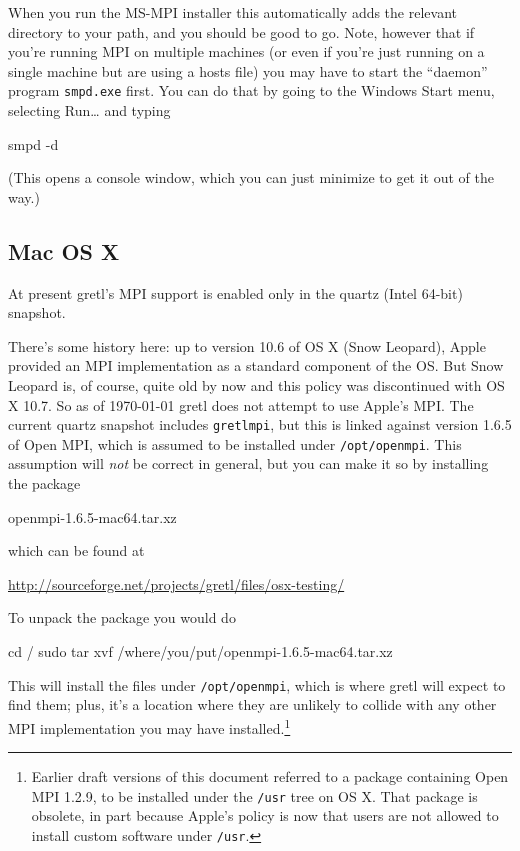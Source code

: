 \documentclass{article}
\begin{document}
When you run the \textsf{MS-MPI} installer this automatically adds the
relevant directory to your path, and you should be good to go. Note,
however that if you're running MPI on multiple machines (or even if
you're just running on a single machine but are using a hosts file)
you may have to start the ``daemon'' program \texttt{smpd.exe}
first. You can do that by going to the Windows Start menu, selecting
\textsf{Run\dots{}} and typing
\begin{code}
smpd -d
\end{code}
(This opens a console window, which you can just minimize to get it
out of the way.)

\subsection{Mac OS X}

At present gretl's MPI support is enabled only in the quartz (Intel
64-bit) snapshot.

There's some history here: up to version 10.6 of OS X (Snow Leopard),
Apple provided an MPI implementation as a standard component of the
OS. But Snow Leopard is, of course, quite old by now and this policy
was discontinued with OS X 10.7. So as of \today{} gretl does not
attempt to use Apple's MPI. The current quartz snapshot includes
\texttt{gretlmpi}, but this is linked against version 1.6.5 of
\textsf{Open MPI}, which is assumed to be installed under
\texttt{/opt/openmpi}. This assumption will \textit{not} be correct in
general, but you can make it so by installing the package
\begin{code}
openmpi-1.6.5-mac64.tar.xz
\end{code}
which can be found at

\url{http://sourceforge.net/projects/gretl/files/osx-testing/}

To unpack the package you would do
\begin{code}
cd /
sudo tar xvf /where/you/put/openmpi-1.6.5-mac64.tar.xz
\end{code}
%
This will install the files under \texttt{/opt/openmpi}, which is
where gretl will expect to find them; plus, it's a location where they
are unlikely to collide with any other MPI implementation you may have
installed.\footnote{Earlier draft versions of this document referred
  to a package containing \textsf{Open MPI} 1.2.9, to be installed
  under the \texttt{/usr} tree on OS X. That package is obsolete, in
  part because Apple's policy is now that users are not allowed to
  install custom software under \texttt{/usr}.}
\end{document}
